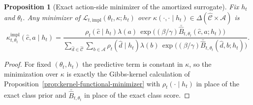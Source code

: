 \documentclass[11pt]{article}
\newtheorem{proposition}[theorem]{Proposition}
\theoremstyle{definition}
\theoremstyle{remark}
\newcommand{\Acal}{\mathcal{A}}
\newcommand{\Ccal}{\mathcal{C}}
\begin{document}
\begin{proposition}[Exact action-side minimizer of the amortized surrogate]
\label{prop:amortized-surrogate-minimizer}
Fix $h_t$ and $\theta_t$. Any minimizer of $\mathcal L_{t,\mathrm{impl}}(\theta_t,\kappa;h_t)$ over $\kappa(\cdot,\cdot\mid h_t)\in\Delta(\widehat{\Ccal}\times\Acal)$ is
\[
\kappa_{t,\theta_t}^{\mathrm{impl}}(\hat c,a\mid h_t)
=
\frac{
\rho_t(\hat c\mid h_t)\lambda(a)\,
\exp\!\bigl((\beta/\gamma)\bar{\widehat B}_{t,\theta_t}(\hat c,a;h_t)\bigr)}
{\sum_{\hat d\in\widehat{\Ccal}}\sum_{b\in\Acal}
\rho_t(\hat d\mid h_t)\lambda(b)\,
\exp\!\bigl((\beta/\gamma)\bar{\widehat B}_{t,\theta_t}(\hat d,b;h_t)\bigr)}.
\]
\end{proposition}

\begin{proof}
For fixed $(\theta_t,h_t)$ the predictive term is constant in $\kappa$, so the minimization over $\kappa$ is exactly the Gibbs-kernel calculation of Proposition~\ref{prop:kernel-functional-minimizer} with $\rho_t(\cdot\mid h_t)$ in place of the exact class prior and $\bar{\widehat B}_{t,\theta_t}$ in place of the exact class score.
\end{proof}
\end{document}
